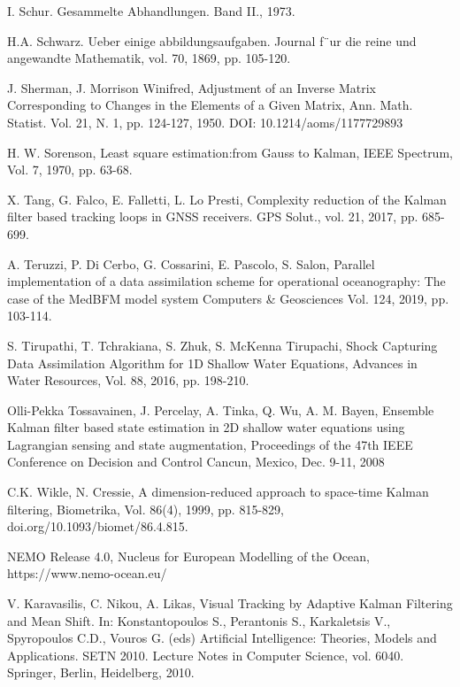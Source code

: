 \documentclass[smallcondensed]{svjour3}
\begin{document}
\begin{thebibliography}{99}
  I. Schur. Gesammelte Abhandlungen. Band II., 1973.

  H.A. Schwarz. Ueber einige abbildungsaufgaben. Journal f¨ur die reine und angewandte Mathematik, vol. 70, 1869, pp. 105-120.


J. Sherman, J. Morrison Winifred,  Adjustment of an Inverse Matrix Corresponding to Changes in the Elements of a Given  Matrix, Ann. Math. Statist.  Vol. 21, N. 1, pp. 124-127, 1950. DOI: 10.1214/aoms/1177729893

H. W. Sorenson, Least square estimation:from Gauss to Kalman, IEEE Spectrum, Vol. 7, 1970,  pp. 63-68.

 X. Tang, G. Falco, E. Falletti, L. Lo Presti,  Complexity reduction of the Kalman filter based tracking loops in GNSS receivers. GPS Solut., vol. 21, 2017, pp. 685-699. 


  A. Teruzzi, P. Di Cerbo, G. Cossarini, E. Pascolo, S. Salon,  Parallel implementation of a data assimilation scheme for operational oceanography: The case of the MedBFM model system
Computers \& Geosciences
Vol. 124,  2019, pp. 103-114.

  S. Tirupathi, T. Tchrakiana, S. Zhuk, S. McKenna Tirupachi, Shock Capturing Data Assimilation Algorithm for 1D Shallow Water Equations, Advances in Water Resources, Vol. 88, 2016, pp. 198-210. 

 Olli-Pekka Tossavainen, J. Percelay, A. Tinka, Q. Wu,  A. M. Bayen, 
Ensemble Kalman filter based state estimation in 2D shallow water equations using Lagrangian sensing and state augmentation,  Proceedings of the
47th IEEE Conference on Decision and Control
Cancun, Mexico, Dec. 9-11, 2008


 C.K. Wikle,  N. Cressie, A dimension-reduced approach to space-time Kalman filtering, Biometrika, Vol. 86(4), 1999, pp. 815-829, doi.org/10.1093/biomet/86.4.815.


 NEMO Release 4.0, Nucleus for European Modelling of the Ocean,  https://www.nemo-ocean.eu/

 V. Karavasilis,  C. Nikou, A. Likas, Visual Tracking by Adaptive Kalman Filtering and Mean Shift. In: Konstantopoulos S., Perantonis S., Karkaletsis V., Spyropoulos C.D., Vouros G. (eds) Artificial Intelligence: Theories, Models and Applications. SETN 2010. Lecture Notes in Computer Science, vol. 6040. Springer, Berlin, Heidelberg, 2010.


\end{thebibliography}
\end{document}
